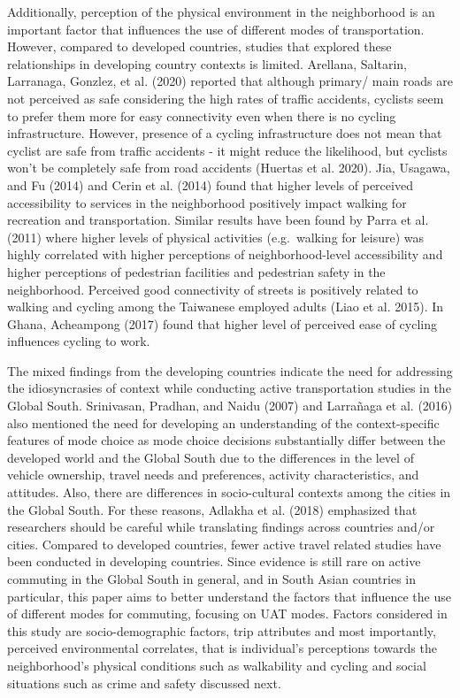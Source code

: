 \documentclass[]{elsarticle} %
\begin{document}
Additionally, perception of the physical environment in the neighborhood
is an important factor that influences the use of different modes of
transportation. However, compared to developed countries, studies that
explored these relationships in developing country contexts is limited.
Arellana, Saltarin, Larranaga, Gonzlez, et al. (2020) reported that
although primary/ main roads are not perceived as safe considering the
high rates of traffic accidents, cyclists seem to prefer them more for
easy connectivity even when there is no cycling infrastructure. However,
presence of a cycling infrastructure does not mean that cyclist are safe
from traffic accidents - it might reduce the likelihood, but cyclists
won't be completely safe from road accidents (Huertas et al. 2020). Jia,
Usagawa, and Fu (2014) and Cerin et al. (2014) found that higher levels
of perceived accessibility to services in the neighborhood positively
impact walking for recreation and transportation. Similar results have
been found by Parra et al. (2011) where higher levels of physical
activities (e.g.~walking for leisure) was highly correlated with higher
perceptions of neighborhood-level accessibility and higher perceptions
of pedestrian facilities and pedestrian safety in the neighborhood.
Perceived good connectivity of streets is positively related to walking
and cycling among the Taiwanese employed adults (Liao et al. 2015). In
Ghana, Acheampong (2017) found that higher level of perceived ease of
cycling influences cycling to work.

The mixed findings from the developing countries indicate the need for
addressing the idiosyncrasies of context while conducting active
transportation studies in the Global South. Srinivasan, Pradhan, and
Naidu (2007) and Larrañaga et al. (2016) also mentioned the need for
developing an understanding of the context-specific features of mode
choice as mode choice decisions substantially differ between the
developed world and the Global South due to the differences in the level
of vehicle ownership, travel needs and preferences, activity
characteristics, and attitudes. Also, there are differences in
socio-cultural contexts among the cities in the Global South. For these
reasons, Adlakha et al. (2018) emphasized that researchers should be
careful while translating findings across countries and/or cities.
Compared to developed countries, fewer active travel related studies
have been conducted in developing countries. Since evidence is still
rare on active commuting in the Global South in general, and in South
Asian countries in particular, this paper aims to better understand the
factors that influence the use of different modes for commuting,
focusing on UAT modes. Factors considered in this study are
socio-demographic factors, trip attributes and most importantly,
perceived environmental correlates, that is individual's perceptions
towards the neighborhood's physical conditions such as walkability and
cycling and social situations such as crime and safety discussed next.
\end{document}
